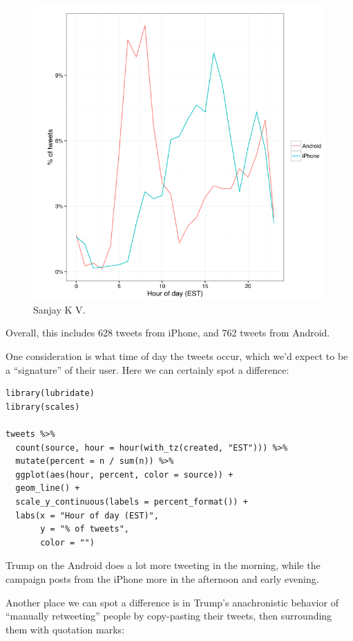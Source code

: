 \documentclass[a4paper,12pt]{article}
\begin{document}
  
  \begin{figure}[h!]
  \includegraphics[width=\linewidth]{Chunk.png}
  \caption{Sanjay K V.}
  \label{fig:Tweet by Todd Vaziri}
\end{figure}
Overall, this includes 628 tweets from iPhone, and 762 tweets from Android.

One consideration is what time of day the tweets occur, which we’d expect to be a “signature” of their user. Here we can certainly spot a difference:



\begin{lstlisting}
library(lubridate)
library(scales)

tweets %>%
  count(source, hour = hour(with_tz(created, "EST"))) %>%
  mutate(percent = n / sum(n)) %>%
  ggplot(aes(hour, percent, color = source)) +
  geom_line() +
  scale_y_continuous(labels = percent_format()) +
  labs(x = "Hour of day (EST)",
       y = "% of tweets",
       color = "")
  \end{lstlisting}
  
  
  Trump on the Android does a lot more tweeting in the morning, while the campaign posts from the iPhone more in the afternoon and early evening.

Another place we can spot a difference is in Trump’s anachronistic behavior of “manually retweeting” people by copy-pasting their tweets, then surrounding them with quotation marks:
\end{document}
